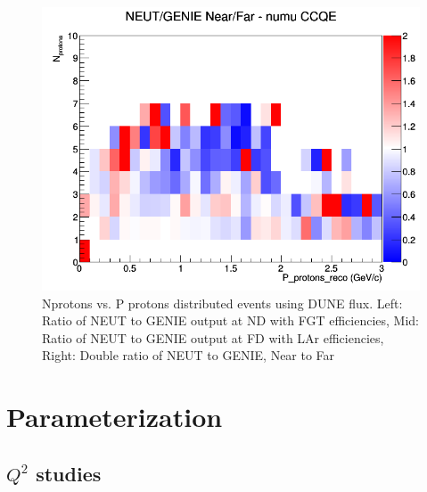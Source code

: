 \documentclass[12pt]{article}
\begin{document}
\begin{figure}[h]
\endminipage
{}
\includegraphics[width=\linewidth]{eff_N_P/FGT/protons/ratios/CCQE_NEUT_GENIE_numu_NF_N_P.png}
\endminipage
\caption{Nprotons vs. P protons distributed events using DUNE flux. Left: Ratio of NEUT to GENIE output at ND with FGT efficiencies, Mid: Ratio of NEUT to GENIE output at FD with LAr efficiencies, Right: Double ratio of NEUT to GENIE, Near to Far}
\end{figure}
\FloatBarrier

\section{Parameterization}
\subsection{$Q^2$ studies}
\end{document}
